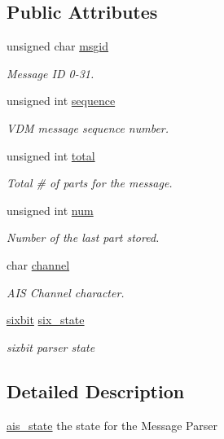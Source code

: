 \subsection*{Public Attributes}
\begin{DoxyCompactItemize}
\item 
unsigned char \mbox{\hyperlink{structais__state_a60e9e905fb708ad025c8f05235ea45c0}{msgid}}
\begin{DoxyCompactList}\small\item\em Message ID 0-\/31. \end{DoxyCompactList}\item 
unsigned int \mbox{\hyperlink{structais__state_acc3dec0720044a75c7419a35ed01e903}{sequence}}
\begin{DoxyCompactList}\small\item\em V\+DM message sequence number. \end{DoxyCompactList}\item 
unsigned int \mbox{\hyperlink{structais__state_a21fa7f41c319c8b0b8a8683424ca449e}{total}}
\begin{DoxyCompactList}\small\item\em Total \# of parts for the message. \end{DoxyCompactList}\item 
unsigned int \mbox{\hyperlink{structais__state_ab9e57e0fec53505653a2e6d31c5b80d8}{num}}
\begin{DoxyCompactList}\small\item\em Number of the last part stored. \end{DoxyCompactList}\item 
char \mbox{\hyperlink{structais__state_a5878295f539fbcd20ae5cb12c4e2da19}{channel}}
\begin{DoxyCompactList}\small\item\em A\+IS Channel character. \end{DoxyCompactList}\item 
\mbox{\hyperlink{structsixbit}{sixbit}} \mbox{\hyperlink{structais__state_a7f348a9ab6b6c2d0d3679a4e802879f1}{six\+\_\+state}}
\begin{DoxyCompactList}\small\item\em sixbit parser state \end{DoxyCompactList}\end{DoxyCompactItemize}


\subsection{Detailed Description}
\mbox{\hyperlink{structais__state}{ais\+\_\+state}} the state for the Message Parser

